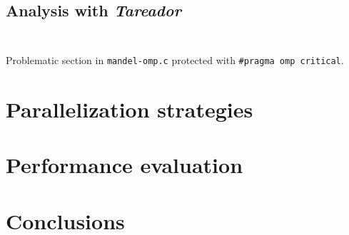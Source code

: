 \subsection{Analysis with \emph{Tareador}}

\begin{listing}[H]
\inputminted[firstline=20,lastline=31]{c}{sources/multisort-tareador-leaf.c}
\inputminted[firstline=33,lastline=51]{c}{sources/multisort-tareador-leaf.c}
\caption{Problematic section in \texttt{mandel-omp.c} protected with \texttt{\#pragma omp critical}.}
\label{listing:mandel-omp-critical}
\end{listing}

\section{Parallelization strategies}%
\label{sec:par_strats}

\section{Performance evaluation}%
\label{sec:perf_eval}

\section{Conclusions}%
\label{sec:conclusions}


